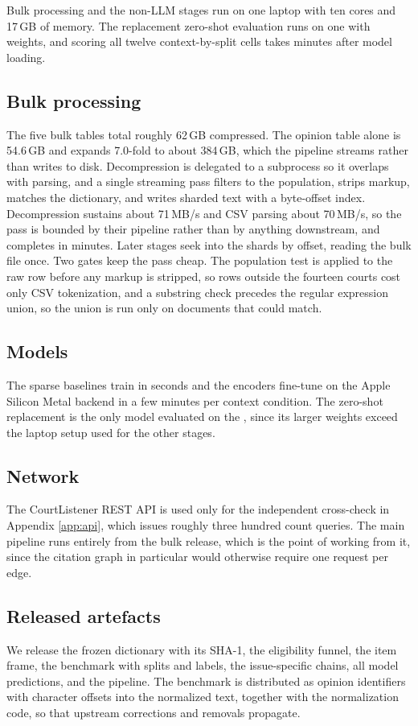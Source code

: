 Bulk processing and the non-LLM stages run on one laptop with ten cores and
17\,GB of memory. The replacement zero-shot evaluation runs on one \LLMDevice{} with
\LLMDtype{} weights, and scoring all twelve context-by-split cells takes \LLMMinutes{} minutes
after model loading.

\subsection{Bulk processing} The five bulk tables total roughly 62\,GB
compressed. The opinion table alone is 54.6\,GB and expands 7.0-fold to about
384\,GB, which the pipeline streams rather than writes to disk. Decompression is delegated to a
subprocess so it overlaps with parsing, and a single streaming pass filters to the
population, strips markup, matches the dictionary, and writes sharded text with a
byte-offset index. Decompression sustains about 71\,MB/s and CSV parsing about
70\,MB/s, so the pass is bounded by their pipeline rather than by anything
downstream, and completes in \PassMinutes{} minutes. Later stages seek into the shards by
offset, reading the bulk file once. Two gates keep the pass cheap. The
population test is applied to the raw row before any markup is stripped, so rows
outside the fourteen courts cost only CSV tokenization, and a substring check
precedes the regular expression union, so the union is run only on documents that
could match.

\subsection{Models} The sparse baselines train in seconds and the encoders
fine-tune on the Apple Silicon Metal backend in a few minutes per context
condition. The zero-shot replacement is the only model evaluated on the \LLMDevice{},
since its larger weights exceed the laptop setup used for the other stages.

\subsection{Network} The CourtListener REST API is used only for the independent
cross-check in Appendix \ref{app:api}, which issues roughly three hundred count
queries. The main pipeline runs entirely from the bulk release, which is the point
of working from it, since the citation graph in particular would otherwise require
one request per edge.

\subsection{Released artefacts} We release the frozen dictionary with its SHA-1,
the eligibility funnel, the item frame, the benchmark with splits and labels, the
issue-specific chains, all model predictions, and the pipeline. The benchmark is
distributed as opinion identifiers with character offsets into the normalized
text, together with the normalization code, so that upstream corrections and
removals propagate.
